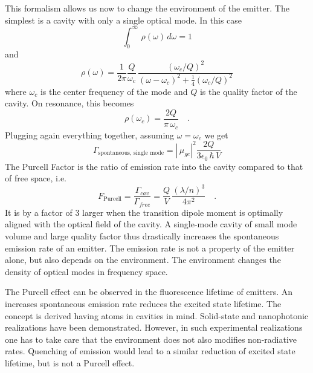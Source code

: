 This formalism allows us now to change the environment of the emitter. The simplest is a cavity with only a single optical mode. In this case 
\begin{equation}
\int_0^\infty \, \rho(\omega) \, d \omega = 1
\end{equation}
and 
\begin{equation}
 \rho(\omega)  = \frac{1}{2 \pi} \frac{Q}{\omega_c} \,
  \frac{(\omega_c / Q)^2}{(\omega - \omega_c)^2 + \frac{1}{4} (\omega_c / Q)^2}
\end{equation}
where $\omega_c$ is the center frequency of the  mode and $Q$ is the quality factor of the cavity. On resonance, this becomes 
\begin{equation}
 \rho(\omega_c)  = \frac{2 Q} {\pi \, \omega_c}  \quad .
\end{equation}
Plugging again everything together, assuming $\omega = \omega_c$ we get
\begin{equation}
 \Gamma_\text{spontaneous, single mode} =   \left| \, \mu_{ge} \right|^2  \frac{2 Q }{ 3 \epsilon_0 \, \hbar \, V} 
\end{equation}
The Purcell Factor is the ratio of emission rate into the cavity compared to that of free space, i.e.
\begin{equation}
F_\text{Purcell} = \frac{\Gamma_{cav}}{\Gamma_{free}} =
  \frac{ Q }{V}   \,  \frac{    (\lambda / n)^3   } {4 \pi^2   }  \quad .
\end{equation}
It is by a factor of 3 larger when the transition dipole moment is optimally aligned with the optical field of the cavity. A single-mode cavity of small mode volume and large quality factor thus drastically increases the spontaneous emission rate of an emitter. The emission rate is not a property of the emitter alone, but also depends on the environment.  The environment changes the density of optical modes in frequency space.

The Purcell effect can be observed in the fluorescence lifetime of emitters. An increases spontaneous emission rate reduces the excited state lifetime. The concept is derived having atoms in cavities in mind.  Solid-state and nanophotonic realizations have been demonstrated.
However, in such experimental realizations one has to take care that the environment  does not also modifies non-radiative rates. Quenching of emission would lead to a similar reduction of excited state lifetime, but is not a Purcell effect.


